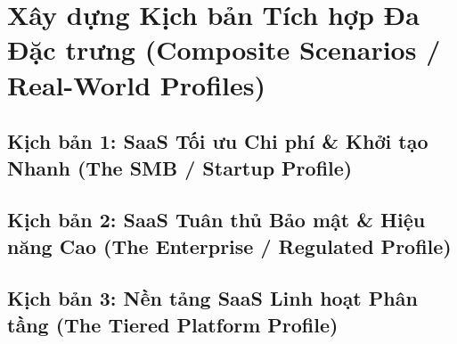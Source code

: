 \par{}
\section{Xây dựng Kịch bản Tích hợp Đa Đặc trưng (Composite Scenarios / Real-World Profiles)}
\label{outline:2:scenarios:1}

\par{}
\subsection{Kịch bản 1: SaaS Tối ưu Chi phí \& Khởi tạo Nhanh (The SMB / Startup Profile)}
\label{outline:2:scenarios:2}

\par{}
\subsection{Kịch bản 2: SaaS Tuân thủ Bảo mật \& Hiệu năng Cao (The Enterprise / Regulated Profile)}
\label{outline:2:scenarios:3}

\par{}
\subsection{Kịch bản 3: Nền tảng SaaS Linh hoạt Phân tầng (The Tiered Platform Profile)}
\label{outline:2:scenarios:4}
